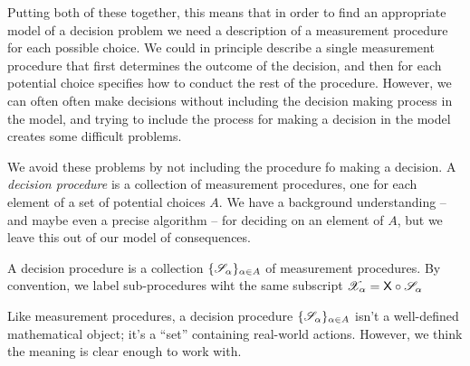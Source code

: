 Putting both of these together, this means that in order to find an appropriate model of a decision problem we need a description of a measurement procedure for each possible choice. We could in principle describe a single measurement procedure that first determines the outcome of the decision, and then for each potential choice specifies how to conduct the rest of the procedure. However, we can often often make decisions without including the decision making process in the model, and trying to include the process for making a decision in the model creates some difficult problems.

We avoid these problems by not including the procedure fo making a decision. A \emph{decision procedure} is a collection of measurement procedures, one for each element of a set of potential choices $A$. We have a background understanding -- and maybe even a precise algorithm -- for deciding on an element of $A$, but we leave this out of our model of consequences. 

\begin{definition}
A decision procedure is a collection $\{\mathscr{S}_\alpha\}_{\alpha\in A}$ of measurement procedures. By convention, we label sub-procedures wiht the same subscript $\mathscr{X}_\alpha=\mathsf{X}\circ\mathscr{S}_\alpha$
\end{definition}

Like measurement procedures, a decision procedure $\{\mathscr{S}_\alpha\}_{\alpha\in A}$ isn't a well-defined mathematical object; it's a ``set'' containing real-world actions. However, we think the meaning is clear enough to work with.